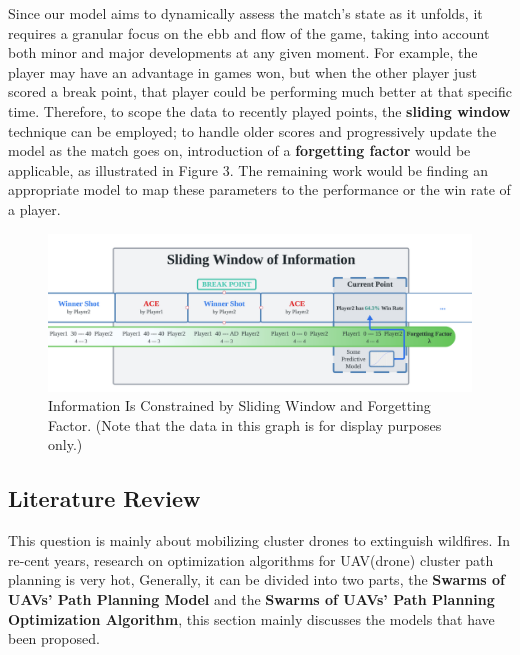 \documentclass[12pt]{article}  %
\begin{document}
Since our model aims to dynamically assess the match's state as it unfolds, it requires a granular focus on the ebb and flow of the game, taking into account both minor and major developments at any given moment. For example, the player may have an advantage in games won, but when the other player just scored a break point, that player could be performing much better at that specific time. Therefore, to scope the data to recently played points, the \textbf{sliding window} technique can be employed; to handle older scores and progressively update the model as the match goes on, introduction of a \textbf{forgetting factor} would be applicable, as illustrated in Figure 3. The remaining work would be finding an appropriate model to map these parameters to the performance or the win rate of a player. 

\begin{figure}[htbp]  %
	\centering  %
	\includegraphics[width=.85\textwidth]{sliding-window.png} %
	\caption{\centering Information Is Constrained by Sliding Window and Forgetting Factor. (Note that the data in this graph is for display purposes only.)} %
\end{figure}


\subsection{Literature Review}
This question is mainly about mobilizing cluster drones to extinguish wildfires. In re-cent years, research on optimization algorithms for UAV(drone) cluster path planning is very hot, Generally, it can be divided into two parts, the \textbf{Swarms of UAVs' Path Planning Model} and the \textbf{Swarms of UAVs' Path Planning Optimization Algorithm}, this section mainly discusses the models that have been proposed.
\end{document}
